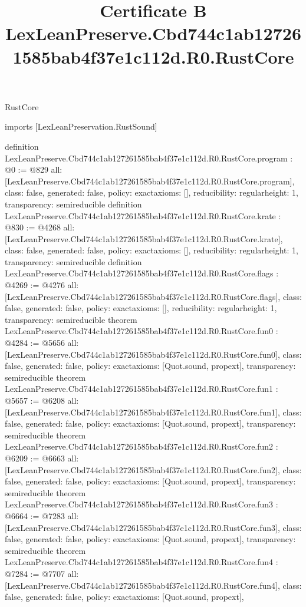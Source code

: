 \begin{lexlean}{RustCore}
\title{Certificate B LexLeanPreserve.Cbd744c1ab127261585bab4f37e1c112d.R0.RustCore}
\begin{coremodule}
imports [LexLeanPreservation.RustSound]

definition LexLeanPreserve.Cbd744c1ab127261585bab4f37e1c112d.R0.RustCore.program : @0 := @829 {
  all: [LexLeanPreserve.Cbd744c1ab127261585bab4f37e1c112d.R0.RustCore.program],
  class: false,
  generated: false,
  policy: exact{axioms: []},
  reducibility: regular{height: 1},
  transparency: semireducible
}
definition LexLeanPreserve.Cbd744c1ab127261585bab4f37e1c112d.R0.RustCore.krate : @830 := @4268 {
  all: [LexLeanPreserve.Cbd744c1ab127261585bab4f37e1c112d.R0.RustCore.krate],
  class: false,
  generated: false,
  policy: exact{axioms: []},
  reducibility: regular{height: 1},
  transparency: semireducible
}
definition LexLeanPreserve.Cbd744c1ab127261585bab4f37e1c112d.R0.RustCore.flags : @4269 := @4276 {
  all: [LexLeanPreserve.Cbd744c1ab127261585bab4f37e1c112d.R0.RustCore.flags],
  class: false,
  generated: false,
  policy: exact{axioms: []},
  reducibility: regular{height: 1},
  transparency: semireducible
}
theorem LexLeanPreserve.Cbd744c1ab127261585bab4f37e1c112d.R0.RustCore.fun0 : @4284 := @5656 {
  all: [LexLeanPreserve.Cbd744c1ab127261585bab4f37e1c112d.R0.RustCore.fun0],
  class: false,
  generated: false,
  policy: exact{axioms: [Quot.sound, propext]},
  transparency: semireducible
}
theorem LexLeanPreserve.Cbd744c1ab127261585bab4f37e1c112d.R0.RustCore.fun1 : @5657 := @6208 {
  all: [LexLeanPreserve.Cbd744c1ab127261585bab4f37e1c112d.R0.RustCore.fun1],
  class: false,
  generated: false,
  policy: exact{axioms: [Quot.sound, propext]},
  transparency: semireducible
}
theorem LexLeanPreserve.Cbd744c1ab127261585bab4f37e1c112d.R0.RustCore.fun2 : @6209 := @6663 {
  all: [LexLeanPreserve.Cbd744c1ab127261585bab4f37e1c112d.R0.RustCore.fun2],
  class: false,
  generated: false,
  policy: exact{axioms: [Quot.sound, propext]},
  transparency: semireducible
}
theorem LexLeanPreserve.Cbd744c1ab127261585bab4f37e1c112d.R0.RustCore.fun3 : @6664 := @7283 {
  all: [LexLeanPreserve.Cbd744c1ab127261585bab4f37e1c112d.R0.RustCore.fun3],
  class: false,
  generated: false,
  policy: exact{axioms: [Quot.sound, propext]},
  transparency: semireducible
}
theorem LexLeanPreserve.Cbd744c1ab127261585bab4f37e1c112d.R0.RustCore.fun4 : @7284 := @7707 {
  all: [LexLeanPreserve.Cbd744c1ab127261585bab4f37e1c112d.R0.RustCore.fun4],
  class: false,
  generated: false,
  policy: exact{axioms: [Quot.sound, propext]},
}
\end{coremodule}
\end{lexlean}
